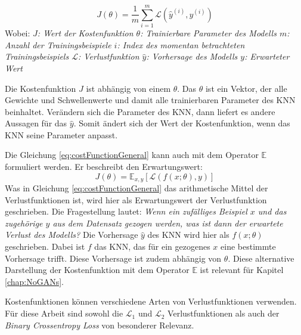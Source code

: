 \begin{equation}
   \label{eq:costFunctionGeneral}
   J(\theta) = \frac{1}{m} \sum_{i=1}^{m} \mathcal{L}(\hat{y}^{(i)}, y^{(i)})
\end{equation}
Wobei: \newline
\emph{\null\quad\quad $J$: Wert der Kostenfunktion \newline
\null\quad\quad $\theta$: Trainierbare Parameter des Modells \newline
\null\quad\quad $m$: Anzahl der Trainingsbeispiele \newline
\null\quad\quad $i$: Index des momentan betrachteten Trainingsbeispiels \newline
\null\quad\quad $\mathcal{L}$: Verlustfunktion \newline
\null\quad\quad $\hat{y}$: Vorhersage des Modells \newline
\null\quad\quad $y$: Erwarteter Wert}

Die Kostenfunktion $J$ ist abhängig von einem $\theta$. Das $\theta$ ist ein Vektor, der alle Gewichte und Schwellenwerte und damit alle trainierbaren Parameter des \ac{KNN} beinhaltet. Verändern sich die Parameter des \ac{KNN}, dann liefert es andere Aussagen für das $\hat{y}$. Somit ändert sich der Wert der Kostenfunktion, wenn das \ac{KNN} seine Parameter anpasst.  \cite{DeepLearningBook}

Die Gleichung \ref{eq:costFunctionGeneral} kann auch mit dem Operator $\mathbb{E}$ formuliert werden. Er beschreibt den Erwartungswert: \cite{DeepLearningBook}
\begin{equation}
	\label{eq:costFunctionExpectedValue}
	J(\theta) = \mathbb{E}_{x,y}[\mathcal{L}(f(x; \theta), y)]
\end{equation}
Was in Gleichung \ref{eq:costFunctionGeneral} das arithmetische Mittel der Verlustfunktionen ist, wird hier als Erwartungswert der Verlustfunktion geschrieben. Die Fragestellung lautet: \emph{Wenn ein zufälliges Beispiel $x$ und das zugehörige $y$ aus dem Datensatz gezogen werden, was ist dann der erwartete Verlust des Modells?} Die Vorhersage $\hat{y}$ des \ac{KNN} wird hier als $f(x; \theta)$ geschrieben. Dabei ist $f$ das \ac{KNN}, das für ein gezogenes $x$ eine bestimmte Vorhersage trifft. Diese Vorhersage ist zudem abhängig von $\theta$. Diese alternative Darstellung der Kostenfunktion mit dem Operator $\mathbb{E}$ ist relevant für Kapitel \ref{chap:NoGANs}. \cite{DeepLearningBook}

Kostenfunktionen können verschiedene Arten von Verlustfunktionen verwenden. Für diese Arbeit sind sowohl die $\mathcal{L}_1$ und $\mathcal{L}_2$ Verlustfunktionen als auch der \emph{Binary Crossentropy Loss} von besonderer Relevanz.

